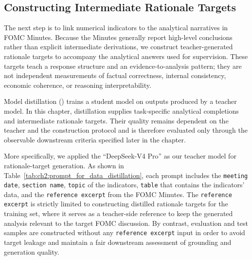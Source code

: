\subsection*{Constructing Intermediate Rationale Targets}


The next step is to link numerical indicators to the analytical narratives in
FOMC Minutes. Because the Minutes generally report high-level conclusions
rather than explicit intermediate derivations, we construct teacher-generated
rationale targets to accompany the analytical answers used for supervision.
These targets teach a response structure and an evidence-to-analysis pattern;
they are not independent measurements of factual correctness, internal
consistency, economic coherence, or reasoning interpretability.



Model distillation (\cite{hinton2015distilling}) trains a student model on
outputs produced by a teacher model. In this chapter, distillation supplies
task-specific analytical completions and intermediate rationale targets. Their
quality remains dependent on the teacher and the construction protocol and is
therefore evaluated only through the observable downstream criteria specified
later in the chapter.



More specifically, we applied the ``DeepSeek-V4 Pro'' as our teacher model for
rationale-target generation. As shown in
Table~\ref{tab:ch2:prompt_for_data_distillation}, each prompt includes the
\texttt{meeting date}, \texttt{section name}, \texttt{topic} of the indicators,
\texttt{table} that contains the indicators' data, and the
\texttt{reference excerpt} from the FOMC Minutes. The
\texttt{reference excerpt} is strictly limited to constructing distilled
rationale targets for the training set, where it serves as a teacher-side
reference to keep the generated analysis relevant to the target FOMC
discussion. By contrast, evaluation and test samples are constructed without
any \texttt{reference excerpt} input in order to avoid target leakage and
maintain a fair downstream assessment of grounding and generation quality.



